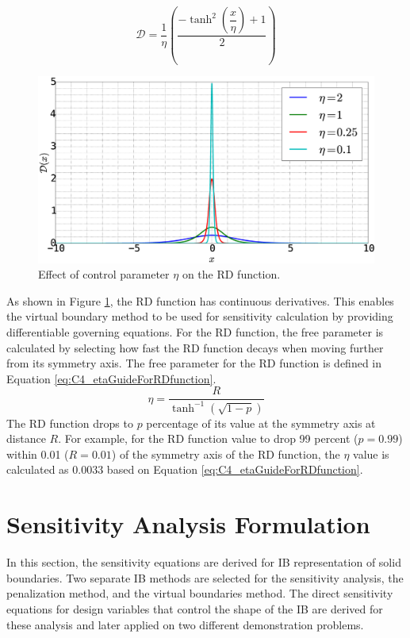 %
\begin{equation}\label{eq:C4_deltaFunction}
    \mathcal{D} = \dfrac{1}{\eta} \left( \dfrac{-\tanh^{2}{\left (\dfrac{x}{\eta} \right )} + 1}{2} \right)
\end{equation}
%
%
\begin{figure}[H]
    \centering
    \includegraphics[width=12.00cm]{Chapter_4/figure/delta_function_with_control.eps}
    \caption{Effect of control parameter $\eta$ on the RD function.}
    \label{fig:C4_deltaFunctionWithControlParamter}
\end{figure}
%
As shown in Figure \ref{fig:C4_deltaFunctionWithControlParamter}, the RD function has continuous derivatives. This enables the virtual boundary method to be used for sensitivity calculation by providing differentiable governing equations. For the RD function, the free parameter is calculated by selecting how fast the RD function decays when moving further from its symmetry axis. The free parameter for the RD function is defined in Equation \eqref{eq:C4_etaGuideForRDfunction}.
%
\begin{equation}\label{eq:C4_etaGuideForRDfunction}
    \eta = \frac{R}{\tanh^{-1} (\sqrt{1 - p})}
\end{equation}
%
The RD function drops to $p$ percentage of its value at the symmetry axis at distance $R$. For example, for the RD function value to drop 99 percent ($p = 0.99$) within 0.01 ($R = 0.01$) of the symmetry axis of the RD function, the $\eta$ value is calculated as $0.0033$ based on Equation \eqref{eq:C4_etaGuideForRDfunction}.
\section{Sensitivity Analysis Formulation}
In this section, the sensitivity equations are derived for IB representation of solid boundaries. Two separate IB methods are selected for the sensitivity analysis, the penalization method, and the virtual boundaries method. The direct sensitivity equations for design variables that control the shape of the IB are derived for these analysis and later applied on two different demonstration problems. 

